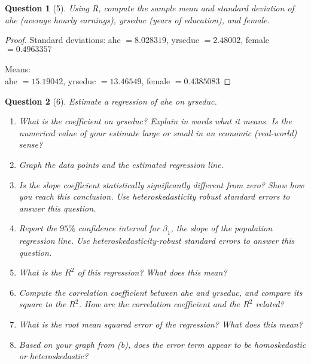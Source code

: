 \documentclass[12pt,reqno]{amsart}
\theoremstyle{plain}
\newtheorem*{theorem*}{Question}
\begin{document}
\begin{theorem*}[5]
    \normalfont
    Using R, compute the sample mean and standard deviation of ahe (average hourly earnings), yrseduc (years of education), and female.
\end{theorem*}
\begin{proof}
    Standard deviations:
    ahe $= 8.028319  $, yrseduc $= 2.48002 $, female $= 0.4963357 $\\\\
    Means: \\
    ahe $= 15.19042  $, yrseduc $= 13.46549 $, female $= 0.4385083 $
\end{proof}
\begin{theorem*}[6]
    \normalfont
    Estimate a regression of ahe on yrseduc.
    \begin{enumerate}
        \item What is the coefficient on yrseduc? Explain in words what it means. Is the numerical
              value of your estimate large or small in an economic (real-world) sense?
        \item Graph the data points and the estimated regression line.
        \item Is the slope coefficient statistically significantly different from zero? Show how you
              reach this conclusion. Use heteroskedasticity robust standard errors to answer this question.
        \item Report the $ 95\% $ confidence interval for $ \beta_{1} $, the slope of the population regression line. Use heteroskedasticity-robust standard errors to answer this question.
        \item What is the $ R^{2} $ of this regression? What does this mean?
        \item Compute the correlation coefficient between ahe and yrseduc, and compare its square to
              the $ R^{2} $. How are the correlation coefficient and the $ R^{2} $ related?
        \item What is the root mean squared error of the regression? What does this mean?
        \item Based on your graph from (b), does the error term appear to be homoskedastic or heteroskedastic?
    \end{enumerate}
\end{theorem*}
\end{document}
